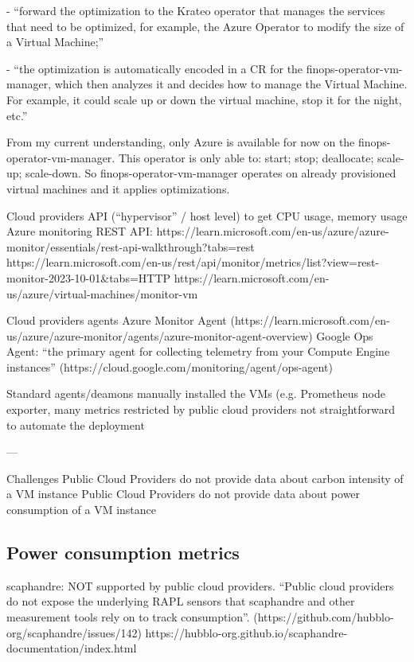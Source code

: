 - “forward the optimization to the Krateo operator that manages the services that need to be optimized, for example, the Azure Operator to modify the size of a Virtual Machine;”

- “the optimization is automatically encoded in a CR for the finops-operator-vm-manager, which then analyzes it and decides how to manage the Virtual Machine. For example, it could scale up or down the virtual machine, stop it for the night, etc.”

From my current understanding, only Azure is available for now on the finops-operator-vm-manager. 
This operator is only able to: start; stop; deallocate; scale-up; scale-down.
So finops-operator-vm-manager operates on already provisioned virtual machines and it applies optimizations.



Cloud providers API (“hypervisor” / host level) to get CPU usage, memory usage
Azure monitoring REST API: https://learn.microsoft.com/en-us/azure/azure-monitor/essentials/rest-api-walkthrough?tabs=rest%
https://learn.microsoft.com/en-us/rest/api/monitor/metrics/list?view=rest-monitor-2023-10-01&tabs=HTTP
https://learn.microsoft.com/en-us/azure/virtual-machines/monitor-vm 


Cloud providers agents
Azure Monitor Agent (https://learn.microsoft.com/en-us/azure/azure-monitor/agents/azure-monitor-agent-overview)
Google Ops Agent: “the primary agent for collecting telemetry from your Compute Engine instances” (https://cloud.google.com/monitoring/agent/ops-agent)


Standard agents/deamons manually installed the VMs (e.g. Prometheus node exporter, 
many metrics restricted by public cloud providers
not straightforward to automate the deployment


---

Challenges
Public Cloud Providers do not provide data about carbon intensity of a VM instance
Public Cloud Providers do not provide data about power consumption of a VM instance

\subsection{Power consumption metrics}

scaphandre: NOT supported by public cloud providers. “Public cloud providers do not expose the underlying RAPL sensors that scaphandre and other measurement tools rely on to track consumption”. (https://github.com/hubblo-org/scaphandre/issues/142)
https://hubblo-org.github.io/scaphandre-documentation/index.html

